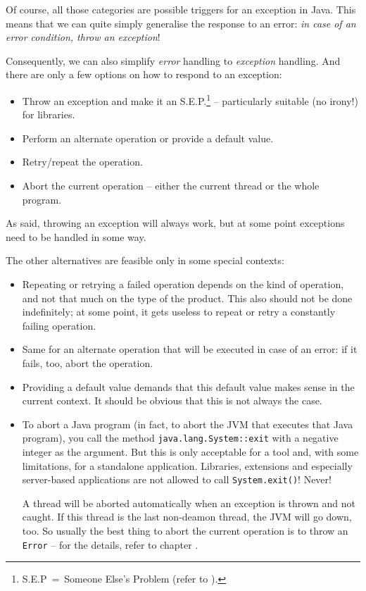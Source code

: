 Of course, all those categories are possible triggers for an exception in Java. This means that we can quite simply generalise the response to an error: \textit{in case of an error condition, throw an exception}!

Consequently, we can also simplify \textit{error} handling to \textit{exception} handling. And there are only a few options on how to respond to an exception:
\begin{itemize}
\item{Throw an exception and make it an S.E.P.\footnote{S.E.P~=~Someone Else's Problem (refer to \autocite{ADAMS_HITCHHIKERS_GUIDE}).} – particularly suitable (no irony!) for libraries.}
\item{Perform an alternate operation or provide a default value.}
\item{Retry/repeat the operation.}
\item{Abort the current operation – either the current thread or the whole program.}
\end{itemize}

As said, throwing an exception will always work, but at some point exceptions need to be handled in some way.

The other alternatives are feasible only in some special contexts:
\begin{itemize}
\item{Repeating or retrying a failed operation depends on the kind of operation, and not that much on the type of the product. This also should not be done indefinitely; at some point, it gets useless to repeat or retry a constantly failing operation.}

\item{Same for an alternate operation that will be executed in case of an error: if it fails, too, abort the operation.}

\item{Providing a default value demands that this default value makes sense in the current context. It should be obvious that this is not always the case.}

\item{To abort a Java program (in fact, to abort the JVM that executes that Java program), you call the method \lstinline|java.lang.System::exit|\autocite{ORACLE_DOC_SYSTEM:exit} with a negative integer as the argument. But this is only acceptable for a tool and, with some limitations, for a standalone application. Libraries, extensions and especially server-based applications are not allowed to call \lstinline|System.exit()|! Never!

A thread will be aborted automatically when an exception is thrown and not caught. If this thread is the last non-deamon thread, the JVM will go down, too. So usually the best thing to abort the current operation is to throw an \lstinline|Error| – for the details, refer to chapter .}
\end{itemize}

